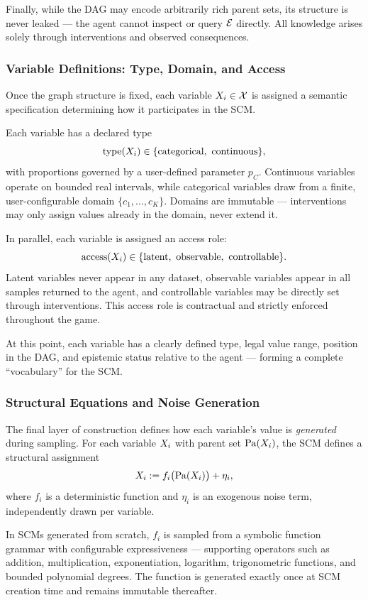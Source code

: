 Finally, while the DAG may encode arbitrarily rich parent sets, its structure is never leaked — the agent cannot inspect or query $\edgesset$ directly. All knowledge arises solely through interventions and observed consequences.

\subsubsection{Variable Definitions: Type, Domain, and Access}
Once the graph structure is fixed, each variable $X_i \in \mathcal{X}$ is assigned a semantic specification determining how it participates in the SCM.

Each variable has a declared type
\[
    \text{type}(X_i) \in \{\text{categorical},\ \text{continuous}\},
\]
with proportions governed by a user-defined parameter $p_C$. Continuous variables operate on bounded real intervals, while categorical variables draw from a finite, user-configurable domain $\{c_1, \dots, c_K\}$. Domains are immutable — interventions may only assign values already in the domain, never extend it.

In parallel, each variable is assigned an access role:
\[
    \text{access}(\varname_i) \in \{\text{latent},\ \text{observable},\ \text{controllable}\}.
\]
Latent variables never appear in any dataset, observable variables appear in all samples returned to the agent, and controllable variables may be directly set through interventions. This access role is contractual and strictly enforced throughout the game.

At this point, each variable has a clearly defined type, legal value range, position in the DAG, and epistemic status relative to the agent — forming a complete “vocabulary” for the SCM.

\subsubsection{Structural Equations and Noise Generation}
The final layer of construction defines how each variable’s value is \emph{generated} during sampling. For each variable $X_i$ with parent set $\mathrm{Pa}(X_i)$, the SCM defines a structural assignment
\[
    X_i := f_i\big(\mathrm{Pa}(X_i)\big) + \eta_i,
\]
where $f_i$ is a deterministic function and $\eta_i$ is an exogenous noise term, independently drawn per variable.

In SCMs generated from scratch, $f_i$ is sampled from a symbolic function grammar with configurable expressiveness — supporting operators such as addition, multiplication, exponentiation, logarithm, trigonometric functions, and bounded polynomial degrees. The function is generated exactly once at SCM creation time and remains immutable thereafter.

